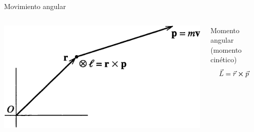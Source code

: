 \documentclass[serif]{beamer}
\begin{document}
\begin{frame}{Movimiento angular} 
\begin{columns}[c]
	\begin{column}{0.35\textwidth}
		\begin{block}{}
			\includegraphics[width=\textwidth]{taylor3_5}
		\end{block}
	\end{column}
  \begin{column}{0.6\textwidth}
		\begin{block}{Momento angular {\tiny (momento cinético)}}
		\[
			\vec{L}=  \vec{r} \cp \vec{p}
		\]
		\end{block}
		\uncover<2>{
		\begin{block}{Torque {\tiny (momento, \(\vec{N}\))}}
			\[
				\dot{\vec{L}} = \cancel{ \dot{\vec{r}} \cp \vec{p}} + \vec{r} \cp \dot{\vec{p}}
			\]
			pues \(\vec{p}= m \dot{\vec{r}} \implies \vec{p} || \dot{\vec{r}} \implies \dot{\vec{r}} \cp \vec{p} = 0 \)
			\pause
			\[
				\vec{\tau} = \dot{\vec{L}}= \vec{r} \cp \vec{F}
			\]
		\end{block}
		}
	\end{column}
\end{columns}
\end{frame}
\end{document}
